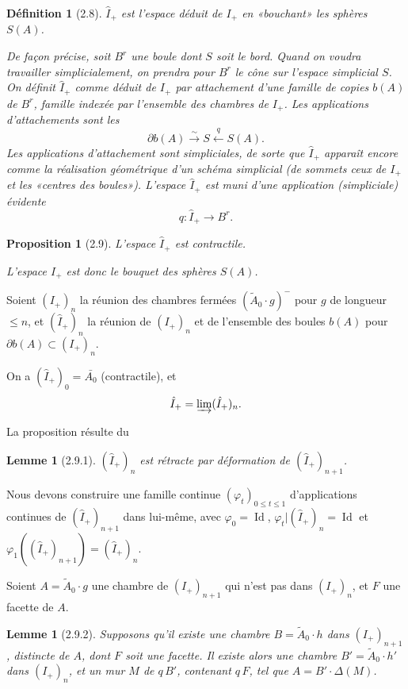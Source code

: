 \documentclass[12pt]{article}
\newtheorem{proposition}[theoreme]{Proposition}
\newtheorem{lemme}[theoreme]{Lemme}
\newtheorem{definition}[theoreme]{Définition}
\theoremstyle{remark}
\begin{document}
\begin{definition}[2.8]
$\hat{I}_+$ est l'espace déduit de $I_+$ en «bouchant» les sphères $S(A)$.

De façon précise, soit $B^r$ une boule dont $S$ soit le bord. Quand on voudra travailler simplicialement, on prendra pour $B^r$ le cône sur l'espace simplicial $S$. On définit $\hat{I}_+$ comme déduit de $I_+$ par attachement d'une famille de copies $b(A)$ de $B^r$, famille indexée par l'ensemble des chambres de $I_+$. Les applications d'attachements sont les
\[\partial b(A) \xrightarrow{\sim} S \xleftarrow{q} S(A).\]
Les applications d'attachement sont simpliciales, de sorte que $\hat{I}_+$ apparaît encore comme la réalisation géométrique d'un schéma simplicial (de sommets ceux de $I_+$ et les «centres des boules»). L'espace $\hat{I}_+$ est muni d'une application (simpliciale) évidente
\[q \colon \hat{I}_+ \to B^r.\]
\end{definition}

\begin{proposition}[2.9]
L'espace $\hat{I}_+$ est contractile.

L'espace $I_+$ est donc le bouquet des sphères $S(A)$.
\end{proposition}

Soient $(I_+)_n$ la réunion des chambres fermées $(\tilde{A}_0 \cdot g)^-$ pour $g$ de longueur $\leq n$, et $(\hat{I}_+)_n$ la réunion de $(I_+)_n$ et de l'ensemble des boules $b(A)$ pour $\partial b(A) \subset (I_+)_n$.

On a $(\hat{I}_+)_0 = \bar{A_0}$ (contractile), et
\[\hat{I}_+ = \varinjlim (\hat{I}_+)_n.\]

La proposition résulte du

\begin{lemme}[2.9.1]
$(\hat{I}_+)_n$ est rétracte par déformation de $(\hat{I}_+)_{n+1}$.
\end{lemme}

Nous devons construire une famille continue $(\varphi_t)_{0 \leq t \leq 1}$ d'applications continues de $(\hat{I}_+)_{n+1}$ dans lui-même, avec $\varphi_0 = \operatorname{Id}$, $\varphi_t|(\hat{I}_+)_n = \operatorname{Id}$ et $\varphi_1((\hat{I}_+)_{n+1}) = (\hat{I}_+)_n$.

Soient $A = \tilde{A}_0 \cdot g$ une chambre de $(I_+)_{n+1}$ qui n'est pas dans $(I_+)_n$, et $F$ une facette de $A$.

\begin{lemme}[2.9.2]
Supposons qu'il existe une chambre $B = \tilde{A}_0 \cdot h$ dans $(I_+)_{n+1}$, distincte de $A$, dont $F$ soit une facette. Il existe alors une chambre $B' = \tilde{A}_0 \cdot h'$ dans $(I_+)_n$, et un mur $M$ de $q \, B'$, contenant $q \, F$, tel que $A = B' \cdot \Delta(M)$.
\end{lemme}
\end{document}
